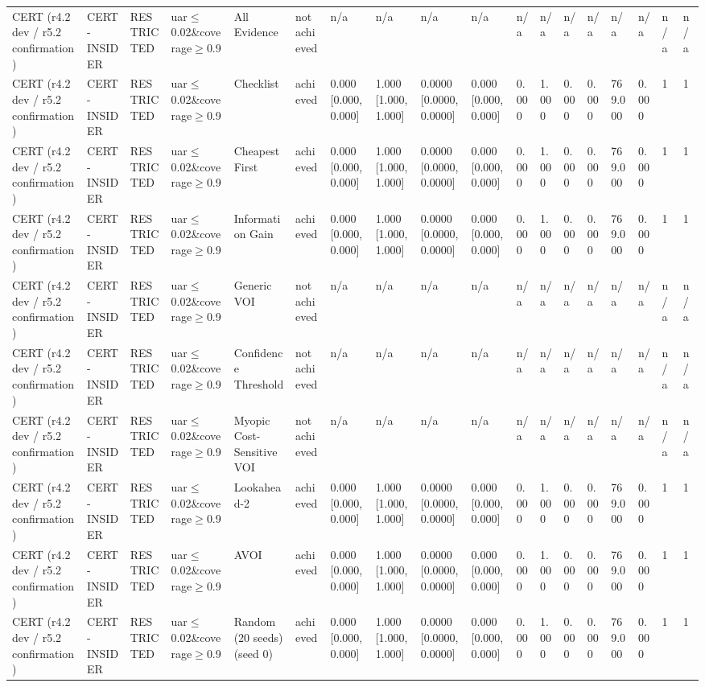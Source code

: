 \begin{table}[!ht]
{\begin{tabular}{llllllllllllllllll}
CERT (r4.2 dev / r5.2 confirmation) & CERT-INSIDER & RESTRICTED & uar$\le$0.02\&coverage$\ge$0.9 & All Evidence & not achieved & n/a & n/a & n/a & n/a & n/a & n/a & n/a & n/a & n/a & n/a & n/a & n/a \\
CERT (r4.2 dev / r5.2 confirmation) & CERT-INSIDER & RESTRICTED & uar$\le$0.02\&coverage$\ge$0.9 & Checklist & achieved & 0.000 [0.000, 0.000] & 1.000 [1.000, 1.000] & 0.0000 [0.0000, 0.0000] & 0.000 [0.000, 0.000] & 0.000 & 1.000 & 0.000 & 0.000 & 769.000 & 0.000 & 1 & 1 \\
CERT (r4.2 dev / r5.2 confirmation) & CERT-INSIDER & RESTRICTED & uar$\le$0.02\&coverage$\ge$0.9 & Cheapest First & achieved & 0.000 [0.000, 0.000] & 1.000 [1.000, 1.000] & 0.0000 [0.0000, 0.0000] & 0.000 [0.000, 0.000] & 0.000 & 1.000 & 0.000 & 0.000 & 769.000 & 0.000 & 1 & 1 \\
CERT (r4.2 dev / r5.2 confirmation) & CERT-INSIDER & RESTRICTED & uar$\le$0.02\&coverage$\ge$0.9 & Information Gain & achieved & 0.000 [0.000, 0.000] & 1.000 [1.000, 1.000] & 0.0000 [0.0000, 0.0000] & 0.000 [0.000, 0.000] & 0.000 & 1.000 & 0.000 & 0.000 & 769.000 & 0.000 & 1 & 1 \\
CERT (r4.2 dev / r5.2 confirmation) & CERT-INSIDER & RESTRICTED & uar$\le$0.02\&coverage$\ge$0.9 & Generic VOI & not achieved & n/a & n/a & n/a & n/a & n/a & n/a & n/a & n/a & n/a & n/a & n/a & n/a \\
CERT (r4.2 dev / r5.2 confirmation) & CERT-INSIDER & RESTRICTED & uar$\le$0.02\&coverage$\ge$0.9 & Confidence Threshold & not achieved & n/a & n/a & n/a & n/a & n/a & n/a & n/a & n/a & n/a & n/a & n/a & n/a \\
CERT (r4.2 dev / r5.2 confirmation) & CERT-INSIDER & RESTRICTED & uar$\le$0.02\&coverage$\ge$0.9 & Myopic Cost-Sensitive VOI & not achieved & n/a & n/a & n/a & n/a & n/a & n/a & n/a & n/a & n/a & n/a & n/a & n/a \\
CERT (r4.2 dev / r5.2 confirmation) & CERT-INSIDER & RESTRICTED & uar$\le$0.02\&coverage$\ge$0.9 & Lookahead-2 & achieved & 0.000 [0.000, 0.000] & 1.000 [1.000, 1.000] & 0.0000 [0.0000, 0.0000] & 0.000 [0.000, 0.000] & 0.000 & 1.000 & 0.000 & 0.000 & 769.000 & 0.000 & 1 & 1 \\
CERT (r4.2 dev / r5.2 confirmation) & CERT-INSIDER & RESTRICTED & uar$\le$0.02\&coverage$\ge$0.9 & AVOI & achieved & 0.000 [0.000, 0.000] & 1.000 [1.000, 1.000] & 0.0000 [0.0000, 0.0000] & 0.000 [0.000, 0.000] & 0.000 & 1.000 & 0.000 & 0.000 & 769.000 & 0.000 & 1 & 1 \\
CERT (r4.2 dev / r5.2 confirmation) & CERT-INSIDER & RESTRICTED & uar$\le$0.02\&coverage$\ge$0.9 & Random (20 seeds) (seed 0) & achieved & 0.000 [0.000, 0.000] & 1.000 [1.000, 1.000] & 0.0000 [0.0000, 0.0000] & 0.000 [0.000, 0.000] & 0.000 & 1.000 & 0.000 & 0.000 & 769.000 & 0.000 & 1 & 1 \\

\end{tabular}}
\end{table}
